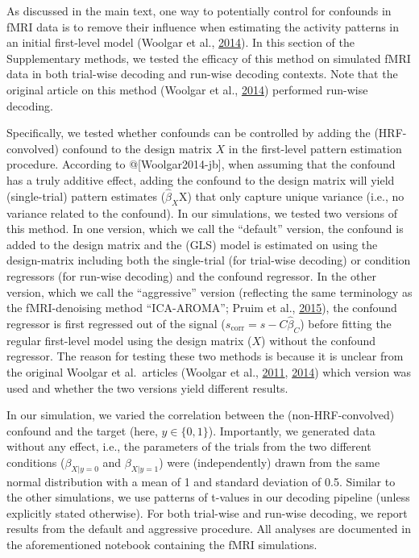 \documentclass[11pt,american,a4paper,oneside,]{memoir} %
\begin{document}
As discussed in the main text, one way to potentially control for confounds in fMRI data is to remove their influence when estimating the activity patterns in an initial first-level model (Woolgar et al., \protect\hyperlink{ref-Woolgar2014-jb}{2014}). In this section of the Supplementary methods, we tested the efficacy of this method on simulated fMRI data in both trial-wise decoding and run-wise decoding contexts. Note that the original article on this method (Woolgar et al., \protect\hyperlink{ref-Woolgar2014-jb}{2014}) performed run-wise decoding.

Specifically, we tested whether confounds can be controlled by adding the (HRF-convolved) confound to the design matrix \(X\) in the first-level pattern estimation procedure. According to @{[}Woolgar2014-jb{]}, when assuming that the confound has a truly additive effect, adding the confound to the design matrix will yield (single-trial) pattern estimates (\(\hat{\beta}_{X}\)X) that only capture unique variance (i.e., no variance related to the confound). In our simulations, we tested two versions of this method. In one version, which we call the ``default'' version, the confound is added to the design matrix and the (GLS) model is estimated on using the design-matrix including both the single-trial (for trial-wise decoding) or condition regressors (for run-wise decoding) and the confound regressor. In the other version, which we call the ``aggressive'' version (reflecting the same terminology as the fMRI-denoising method ``ICA-AROMA''; Pruim et al., \protect\hyperlink{ref-pruim2015ica}{2015}), the confound regressor is first regressed out of the signal (\(s_{\mathrm{corr}} = s- C\hat{\beta}_{C}\)) before fitting the regular first-level model using the design matrix (\(X\)) without the confound regressor. The reason for testing these two methods is because it is unclear from the original Woolgar et al.~articles (Woolgar et al., \protect\hyperlink{ref-woolgar2011multi}{2011}, \protect\hyperlink{ref-Woolgar2014-jb}{2014}) which version was used and whether the two versions yield different results.

In our simulation, we varied the correlation between the (non-HRF-convolved) confound and the target (here, \(y \in \{0,1\}\)). Importantly, we generated data without any effect, i.e., the parameters of the trials from the two different conditions (\(\beta_{X | y = 0}\) and \(\beta_{X | y = 1}\)) were (independently) drawn from the same normal distribution with a mean of 1 and standard deviation of 0.5. Similar to the other simulations, we use patterns of t-values in our decoding pipeline (unless explicitly stated otherwise). For both trial-wise and run-wise decoding, we report results from the default and aggressive procedure. All analyses are documented in the aforementioned notebook containing the fMRI simulations.
\end{document}
